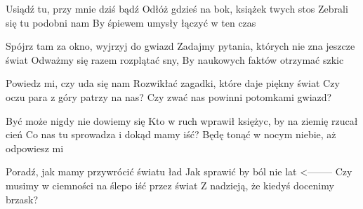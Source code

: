 \begin{flushleft}    
Usiądź tu, przy mnie dziś bądź
Odłóż gdzieś na bok, książek twych stos
Zebrali się tu podobni nam
By śpiewem umysły łączyć w ten czas

Spójrz tam za okno, wyjrzyj do gwiazd
Zadajmy pytania, których nie zna jeszcze świat
Odważmy się razem rozplątać sny, 
By naukowych faktów otrzymać szkic

Powiedz mi, czy uda się nam
Rozwikłać zagadki, które daje piękny świat
Czy oczu para z góry patrzy na nas? 
Czy zwać nas powinni potomkami gwiazd?

Być może nigdy nie dowiemy się 
Kto w ruch wprawił księżyc, by na ziemię rzucał cień 
Co nas tu sprowadza i dokąd mamy iść?
Będę tonąć w nocym niebie, aż odpowiesz mi

Poradź, jak mamy przywrócić światu ład
Jak sprawić by ból nie     lat <--------
Czy musimy w ciemności na ślepo iść przez świat
Z nadzieją, że kiedyś docenimy brzask?
\end{flushleft}
